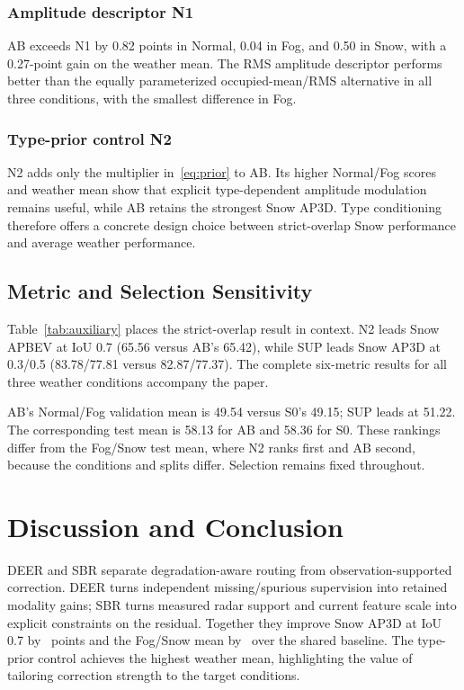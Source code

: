 \subsubsection{Amplitude descriptor N1}
AB exceeds N1 by 0.82 points in Normal, 0.04 in Fog, and 0.50 in Snow, with a 0.27-point gain on the weather mean. The RMS amplitude descriptor performs better than the equally parameterized occupied-mean/RMS alternative in all three conditions, with the smallest difference in Fog.

\subsubsection{Type-prior control N2}
N2 adds only the multiplier in~\eqref{eq:prior} to AB. Its higher Normal/Fog scores and weather mean show that explicit type-dependent amplitude modulation remains useful, while AB retains the strongest Snow AP3D. Type conditioning therefore offers a concrete design choice between strict-overlap Snow performance and average weather performance.

\subsection{Metric and Selection Sensitivity}
Table~\ref{tab:auxiliary} places the strict-overlap result in context. N2 leads Snow APBEV at IoU 0.7 (65.56 versus AB's 65.42), while SUP leads Snow AP3D at 0.3/0.5 (83.78/77.81 versus 82.87/77.37). The complete six-metric results for all three weather conditions accompany the paper.

\begin{table}[t]
\caption{Auxiliary Test AP (\%; Higher Is Better). Left: Snow AP3D at IoU 0.3/0.5; Right: APBEV at IoU 0.7 for Each Weather Condition. Bold Indicates Column Maxima.}
\label{tab:auxiliary}
\centering

\end{table}

AB's Normal/Fog validation mean is 49.54 versus S0's 49.15; SUP leads at 51.22. The corresponding test mean is 58.13 for AB and 58.36 for S0. These rankings differ from the Fog/Snow test mean, where N2 ranks first and AB second, because the conditions and splits differ. Selection remains fixed throughout.

\section{Discussion and Conclusion}
DEER and SBR separate degradation-aware routing from observation-supported correction. DEER turns independent missing/spurious supervision into retained modality gains; SBR turns measured radar support and current feature scale into explicit constraints on the residual. Together they improve Snow AP3D at IoU 0.7 by \ABSnowGain\ points and the Fog/Snow mean by \ABMeanGain\ over the shared baseline. The type-prior control achieves the highest weather mean, highlighting the value of tailoring correction strength to the target conditions.

